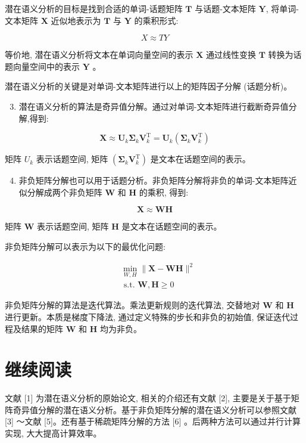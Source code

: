 \documentclass[10pt]{article}
\begin{document}
潜在语义分析的目标是找到合适的单词-话题矩阵 $\boldsymbol{T}$ 与话题-文本矩阵 $\boldsymbol{Y}$, 将单词-文本矩阵 $\boldsymbol{X}$ 近似地表示为 $\boldsymbol{T}$ 与 $\boldsymbol{Y}$ 的乘积形式:

$$
X \approx T Y
$$

等价地, 潜在语义分析将文本在单词向量空间的表示 $\boldsymbol{X}$ 通过线性变换 $\boldsymbol{T}$ 转换为话题向量空间中的表示 $\boldsymbol{Y}$ 。

潜在语义分析的关键是对单词-文本矩阵进行以上的矩阵因子分解 (话题分析)。

\begin{enumerate}
  \setcounter{enumi}{2}
  \item 潜在语义分析的算法是奇异值分解。通过对单词-文本矩阵进行截断奇异值分解,得到:
\end{enumerate}

$$
\boldsymbol{X} \approx \boldsymbol{U}_{k} \boldsymbol{\Sigma}_{k} \boldsymbol{V}_{k}^{\mathrm{T}}=\boldsymbol{U}_{k}\left(\boldsymbol{\Sigma}_{k} \boldsymbol{V}_{k}^{\mathrm{T}}\right)
$$

矩阵 $U_{k}$ 表示话题空间, 矩阵 $\left(\boldsymbol{\Sigma}_{k} \boldsymbol{V}_{k}^{\mathrm{T}}\right)$ 是文本在话题空间的表示。

\begin{enumerate}
  \setcounter{enumi}{3}
  \item 非负矩阵分解也可以用于话题分析。非负矩阵分解将非负的单词-文本矩阵近似分解成两个非负矩阵 $\boldsymbol{W}$ 和 $\boldsymbol{H}$ 的乘积, 得到:
\end{enumerate}

$$
\boldsymbol{X} \approx \boldsymbol{W} \boldsymbol{H}
$$

矩阵 $\boldsymbol{W}$ 表示话题空间, 矩阵 $\boldsymbol{H}$ 是文本在话题空间的表示。

非负矩阵分解可以表示为以下的最优化问题:

$$
\begin{aligned}
& \min _{W, H}\|\boldsymbol{X}-\boldsymbol{W} \boldsymbol{H}\|^{2} \\
& \text { s.t. } \boldsymbol{W}, \boldsymbol{H} \geqslant 0
\end{aligned}
$$

非负矩阵分解的算法是迭代算法。乘法更新规则的迭代算法, 交替地对 $\boldsymbol{W}$ 和 $\boldsymbol{H}$ 进行更新。本质是梯度下降法, 通过定义特殊的步长和非负的初始值, 保证迭代过程及结果的矩阵 $\boldsymbol{W}$ 和 $\boldsymbol{H}$ 均为非负。

\section*{继续阅读}
文献 [1] 为潜在语义分析的原始论文, 相关的介绍还有文献 [2], 主要是关于基于矩阵奇异值分解的潜在语义分析。基于非负矩阵分解的潜在语义分析可以参照文献 [3] ～文献 [5]。还有基于稀疏矩阵分解的方法 [6] 。后两种方法可以通过并行计算实现, 大大提高计算效率。
\end{document}
